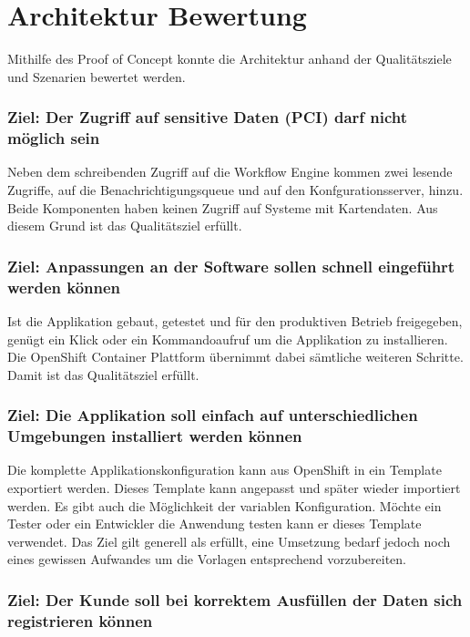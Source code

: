 \section{Architektur Bewertung}

Mithilfe des Proof of Concept konnte die Architektur anhand der Qualitätsziele und Szenarien bewertet werden.

\subsubsection{Ziel: Der Zugriff auf sensitive Daten (PCI) darf nicht möglich sein}

Neben dem schreibenden Zugriff auf die Workflow Engine kommen zwei lesende Zugriffe, auf die Benachrichtigungsqueue und auf den Konfgurationsserver, hinzu. Beide Komponenten haben keinen Zugriff auf Systeme mit Kartendaten. Aus diesem Grund ist das Qualitätsziel erfüllt.

\subsubsection{Ziel: Anpassungen an der Software sollen schnell eingeführt werden können}

Ist die Applikation gebaut, getestet und für den produktiven Betrieb freigegeben, genügt ein Klick oder ein Kommandoaufruf um die Applikation zu installieren. Die OpenShift Container Plattform übernimmt dabei sämtliche weiteren Schritte. Damit ist das Qualitätsziel erfüllt.

\subsubsection{Ziel: Die Applikation soll einfach auf unterschiedlichen Umgebungen installiert werden können}

Die komplette Applikationskonfiguration kann aus OpenShift in ein Template exportiert werden. Dieses Template kann angepasst und später wieder importiert werden. Es gibt auch die Möglichkeit der variablen Konfiguration. Möchte ein Tester oder ein Entwickler die Anwendung testen kann er dieses Template verwendet. Das Ziel gilt generell als erfüllt, eine Umsetzung bedarf jedoch noch eines gewissen Aufwandes um die Vorlagen entsprechend vorzubereiten.

\subsubsection{Ziel: Der Kunde soll bei korrektem Ausfüllen der Daten sich registrieren können}


